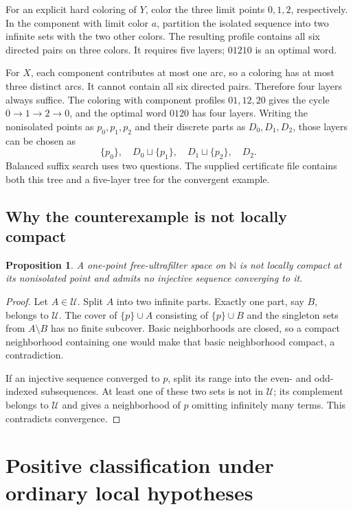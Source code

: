 \documentclass[11pt,letterpaper]{article}
\numberwithin{equation}{section}
\newtheorem{proposition}[proposition]{Proposition}
\theoremstyle{definition}
\theoremstyle{remark}
\theoremstyle{definition}
\newcommand{\N}{\mathbb N}
\newcommand{\U}{\mathcal U}
\newcommand{\sq}{\mathbin{\sqcup}}
\begin{document}
For an explicit hard coloring of \(Y\), color the three limit points
\(0,1,2\), respectively. In the component with limit color \(a\),
partition the isolated sequence into two infinite sets with the two other
colors. The resulting profile contains all six directed pairs on three
colors. It requires five layers; \(01210\) is an optimal word.

For \(X\), each component contributes at most one arc, so a coloring
has at most three distinct arcs. It cannot contain all six directed pairs.
Therefore four layers always suffice. The coloring with component profiles
\(01,12,20\) gives the cycle \(0\to1\to2\to0\), and the optimal
word \(0120\) has four layers. Writing the nonisolated points as
\(p_0,p_1,p_2\) and their discrete parts as \(D_0,D_1,D_2\), those
layers can be chosen as
\[
 \{p_0\},\quad D_0\sq\{p_1\},\quad
 D_1\sq\{p_2\},\quad D_2.
\]
Balanced suffix search uses two questions. The supplied certificate file
contains both this tree and a five-layer tree for the convergent example.

\subsection{Why the counterexample is not locally compact}

\begin{proposition}\label{fp:prop:ultra-noncompact}
A one-point free-ultrafilter space on \(\N\) is not locally compact at
its nonisolated point and admits no injective sequence converging to it.
\end{proposition}
\begin{proof}
Let \(A\in\U\). Split \(A\) into two infinite parts. Exactly one
part, say \(B\), belongs to \(\U\). The cover of \(\{p\}\cup A\)
consisting of \(\{p\}\cup B\) and the singleton sets from \(A\setminus B\)
has no finite subcover. Basic neighborhoods are closed, so a compact
neighborhood containing one would make that basic neighborhood compact,
a contradiction.

If an injective sequence converged to \(p\), split its range into the
even- and odd-indexed subsequences. At least one of these two sets is not
in \(\U\); its complement belongs to \(\U\) and gives a neighborhood
of \(p\) omitting infinitely many terms. This contradicts convergence.
\end{proof}

\section{Positive classification under ordinary local hypotheses}
\label{fp:sec:positive}
\end{document}
